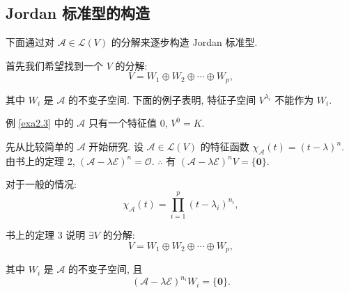 \documentclass[color=black,device=normal,lang=cn,mode=geye]{elegantnote}
\begin{document}
\subsection{Jordan 标准型的构造}
下面通过对 $\mathcal{A}\in\mathcal{L}(V)$ 的分解来逐步构造 Jordan 标准型.

首先我们希望找到一个 $V$ 的分解:
\[V=W_1\oplus W_2\oplus\cdots\oplus W_p,\]

其中 $W_i$ 是 $\mathcal{A}$ 的不变子空间. 下面的例子表明, 特征子空间 $V^{\lambda_i}$ 不能作为 $W_i$.
\begin{example}
    例 \ref{exa2.3} 中的 $\mathcal{A}$ 只有一个特征值 $0$, $V^0=K$.
\end{example}

先从比较简单的 $\mathcal{A}$ 开始研究. 设 $\mathcal{A}\in\mathcal{L}(V)$ 的特征函数 $\chi_{\mathcal{A}}(t)=(t-\lambda)^n$. 由书上的定理 2, $(\mathcal{A}-\lambda\mathcal{E})^n=\mathcal{O}$. $\therefore$ 有 $(\mathcal{A}-\lambda\mathcal{E})^nV=\{\boldsymbol{0}\}$.

对于一般的情况:
\[\chi_{\mathcal{A}}(t)=\prod\limits_{i=1}^p(t-\lambda_i)^{n_i},\]

书上的定理 3 说明 $\exists V$ 的分解:
\[V=W_1\oplus W_2\oplus\cdots\oplus W_p,\]

其中 $W_i$ 是 $\mathcal{A}$ 的不变子空间, 且
\[(\mathcal{A}-\lambda\mathcal{E})^{n_i}W_i=\{\boldsymbol{0}\}.\]
\end{document}

